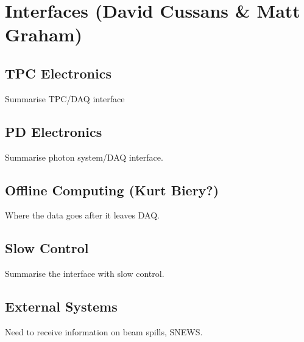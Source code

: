 
\section{Interfaces (David Cussans \& Matt Graham)}
\label{sec:fdsp-daq-intfc}



\subsection{TPC Electronics}
\label{sec:fdsp-daq-intfc-elec}

Summarise TPC/DAQ interface

\subsection{PD Electronics}
\label{sec:fdsp-daq-intfc-photon}

Summarise photon system/DAQ interface.

\subsection{Offline Computing (Kurt Biery?)}
\label{sec:fdsp-daq-intfc-fnal-cmptg}

Where the data goes after it leaves DAQ.

\subsection{Slow Control}
\label{sec:fdsp-daq-intfc-ext}

Summarise the interface with slow control.


\subsection{External Systems}
\label{sec:fdsp-daq-intfc-ext}

Need to receive information on beam spills, SNEWS.
